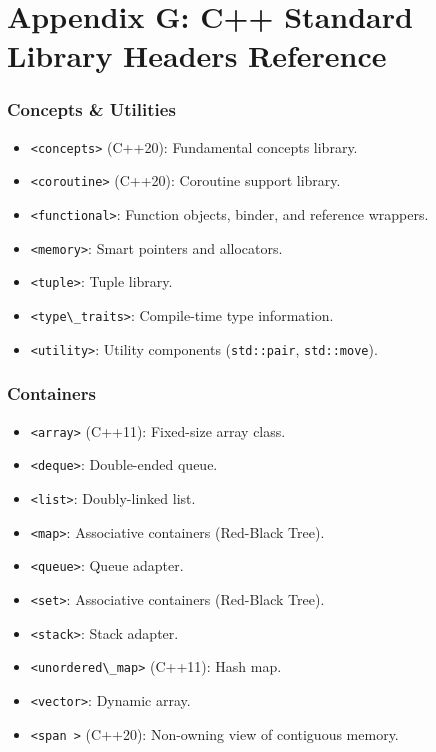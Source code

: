 \hypertarget{appendix-g-c-standard-library-headers-reference}{%
\chapter{Appendix G: C++ Standard Library Headers
Reference}\label{appendix-g-c-standard-library-headers-reference}}

\hypertarget{concepts-utilities}{%
\subsection{Concepts \& Utilities}\label{concepts-utilities}}

\begin{itemize}
\tightlist
\item
  \passthrough{\lstinline!<concepts>!} (C++20): Fundamental concepts
  library.
\item
  \passthrough{\lstinline!<coroutine>!} (C++20): Coroutine support
  library.
\item
  \passthrough{\lstinline!<functional>!}: Function objects, binder, and
  reference wrappers.
\item
  \passthrough{\lstinline!<memory>!}: Smart pointers and allocators.
\item
  \passthrough{\lstinline!<tuple>!}: Tuple library.
\item
  \passthrough{\lstinline!<type\_traits>!}: Compile-time type
  information.
\item
  \passthrough{\lstinline!<utility>!}: Utility components
  (\passthrough{\lstinline!std::pair!},
  \passthrough{\lstinline!std::move!}).
\end{itemize}

\hypertarget{containers}{%
\subsection{Containers}\label{containers}}

\begin{itemize}
\tightlist
\item
  \passthrough{\lstinline!<array>!} (C++11): Fixed-size array class.
\item
  \passthrough{\lstinline!<deque>!}: Double-ended queue.
\item
  \passthrough{\lstinline!<list>!}: Doubly-linked list.
\item
  \passthrough{\lstinline!<map>!}: Associative containers (Red-Black
  Tree).
\item
  \passthrough{\lstinline!<queue>!}: Queue adapter.
\item
  \passthrough{\lstinline!<set>!}: Associative containers (Red-Black
  Tree).
\item
  \passthrough{\lstinline!<stack>!}: Stack adapter.
\item
  \passthrough{\lstinline!<unordered\_map>!} (C++11): Hash map.
\item
  \passthrough{\lstinline!<vector>!}: Dynamic array.
\item
  \passthrough{\lstinline!<span >!} (C++20): Non-owning view of
  contiguous memory.
\end{itemize}

